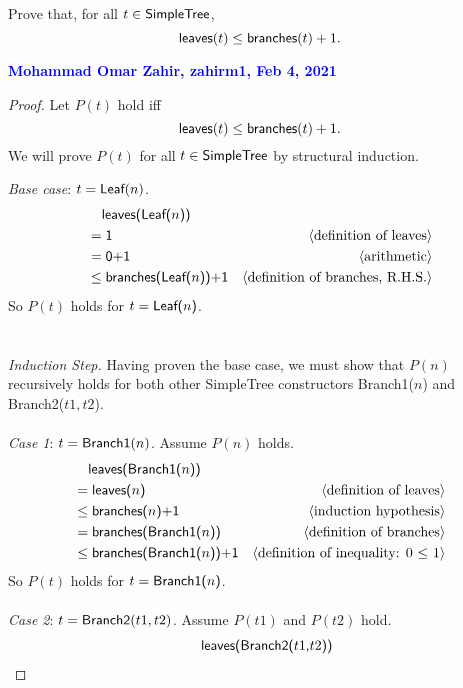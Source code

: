 \documentclass[11pt,fleqn]{article}
\newcommand{\mname}[1]{\mbox{\sf #1}}
\newcommand{\pnote}[1]{{\langle \text{#1} \rangle}}
\begin{document}
  Prove that, for all $t \in \mname{SimpleTree}$, \[\mname{leaves}(t) \le
  \mname{branches}(t) + 1.\]

  \textcolor{blue}{\textbf{Mohammad Omar Zahir, zahirm1, Feb 4, 2021}}
  
  \begin{proof}
    Let $P(t)$ hold iff \[\mname{leaves}(t) \le
  \mname{branches}(t) + 1.\]
    We will prove $P(t)$ for all $t \in \mname{SimpleTree}$ by structural induction.
    
    \medskip
    
    \emph{Base case}: $t = \mname{Leaf}(n)$.
    \begin{align*}
      &\phantom{{}=} \mname {leaves(Leaf($n$))} \\
      &= \mname{1}  & \pnote{definition of leaves}\\
      &= \mname{0+1}  & \pnote{arithmetic}\\
      &\le \mname{branches(Leaf($n$))+1}  & \pnote{definition of branches, R.H.S.}
    \end{align*}
    So $P(t)$ holds for $t = \mname{Leaf($n$)}$.
    \\\\\\
    \emph{Induction Step.} Having proven the base case, we must show that $P(n)$ recursively holds for both other SimpleTree constructors Branch1($n$) and Branch2($t1, t2$).\\\\
    \emph{Case 1}: $t = \mname{Branch1}(n)$. Assume $P(n)$ holds.
    \begin{align*}
      &\phantom{{}=} \mname {leaves(Branch1($n$))} \\
      &= \mname{leaves($n$)}  & \pnote{definition of leaves}\\
      &\le \mname{branches($n$)+1}  & \pnote{induction hypothesis}\\
      &= \mname{branches(Branch1($n$))}  & \pnote{definition of branches}\\
      &\le \mname{branches(Branch1($n$))+1}  & \pnote{definition of inequality: 0 $\le$ 1}\\
    \end{align*}
    So $P(t)$ holds for $t = \mname{Branch1($n$)}$.
    \\\\
    \emph{Case 2}: $t = \mname{Branch2}(t1,t2)$. Assume $P(t1)$ and $P(t2)$ hold.
    \begin{align*}
      &\phantom{{}=} \mname {leaves(Branch2($t1$,$t2$))} \\

\end{align*}
\end{proof}
\end{document}
